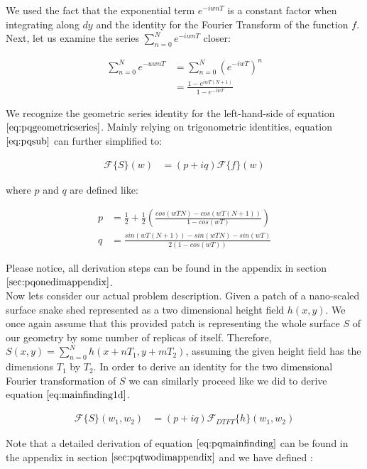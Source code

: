 We used the fact that the exponential term $e^{-iwnT}$ is a constant factor when integrating along $dy$ and the identity for the Fourier Transform of the function $f$. Next, let us examine the series $\sum_{n=0}^N e^{-iwnT}$ closer:

\begin{align}
\sum_{n=0}^N e^{-uwnT}
& =\sum_{n=0}^N (e^{-iwT})^n \nonumber \\
& =\frac{1-e^{iwT(N+1)}}{1-e^{-iwT}}
\label{eq:pqgeometricseries}
\end{align}

We recognize the geometric series identity for the left-hand-side of equation $\ref{eq:pqgeometricseries}$. Mainly relying on trigonometric identities, equation $\ref{eq:pqsub}$ can further simplified to:  

\begin{align}
\mathcal{F}\{S\}(w)
& = (p+iq) \mathcal{F}\{f\}(w)  
\label{eq:mainfinding1d}
\end{align}

where $p$ and $q$ are defined like:

\begin{align}
p& =\frac{1}{2}+\frac{1}{2}\left(\frac{cos(wTN)-cos(wT(N+1))}{1-cos(wT)}\right) \nonumber \\
q& =\frac{sin(wT(N+1))-sin(wTN)-sin(wT)}{2(1-cos(wT))}
\end{align}

Please notice, all derivation steps can be found in the appendix in section $\ref{sec:pqonedimappendix}$. \\

Now lets consider our actual problem description. Given a patch of a nano-scaled surface snake shed represented as a two dimensional height field $h(x,y)$. We once again assume that this provided patch is representing the whole surface $S$ of our geometry by some number of replicas of itself. Therefore, $S(x,y) = \sum_{n=0}^{N} h(x+nT_1, y+mT_2)$, assuming the given height field has the dimensions $T_1$ by $T_2$. In order to derive an identity for the two dimensional Fourier transformation of $S$ we can similarly proceed like we did to derive equation $\ref{eq:mainfinding1d}$.

\begin{align}
\mathcal{F}\{S\}(w_1, w_2)
& =(p + iq) \mathcal{F}_{DTFT}\{h\}(w_1,w_2)
\label{eq:pqmainfinding}
\end{align}

Note that a detailed derivation of equation $\ref{eq:pqmainfinding}$ can be found in the appendix in section $\ref{sec:pqtwodimappendix}$ and we have defined :


